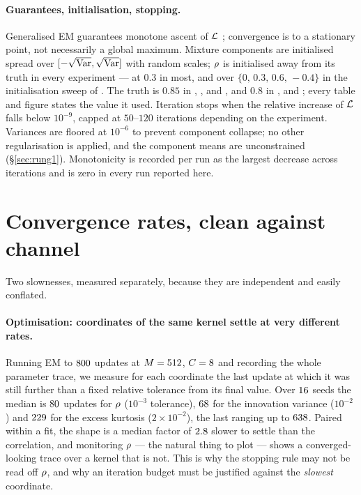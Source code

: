 \paragraph{Guarantees, initialisation, stopping.} Generalised EM guarantees monotone ascent of
$\mathcal{L}$ \citep{dempster1977maximum,wu1983}; convergence is to a stationary point, not necessarily a global
maximum. Mixture components are initialised spread over $[-\sqrt{\operatorname{Var}}, \sqrt{\operatorname{Var}}]$ with random
scales; $\rho$ is initialised away from its truth in every experiment --- at $0.3$ in most, and
over $\{0,\,0.3,\,0.6,\,-0.4\}$ in the initialisation sweep of . The truth is
$0.85$ in , ,  and , and
$0.8$ in ,  and ; every table and figure
states the value it used. Iteration
stops when the relative increase of $\mathcal{L}$ falls below $10^{-9}$, capped at $50$--$120$
iterations depending on the experiment. Variances are floored at $10^{-6}$ to prevent component
collapse; no other regularisation is applied, and the component means are unconstrained
(\S\ref{sec:rung1}). Monotonicity is recorded per run as the largest decrease across iterations and
is zero in every run reported here.

\section{Convergence rates, clean against channel}
\label{app:rates}

Two slownesses, measured separately, because they are independent and easily conflated.

\paragraph{Optimisation: coordinates of the same kernel settle at very different rates.} Running
EM to $800$ updates at $M=512$, $C=8$ and recording the whole parameter
trace, we measure for each coordinate the last update at which it was still further than a fixed
relative tolerance from its final value. Over $16$ seeds the median is $80$ updates
for $\rho$ ($10^{-3}$ tolerance), $68$ for the innovation variance
($10^{-2}$) and $229$ for the excess kurtosis ($2\times10^{-2}$), the
last ranging up to $638$. Paired within a fit, the shape is a
median factor of $2.8$ slower to
settle than the correlation, and monitoring $\rho$ --- the natural thing to plot --- shows a
converged-looking trace over a kernel that is not. This is why the stopping rule may not be read
off $\rho$, and why an iteration budget must be justified against the \emph{slowest} coordinate.

